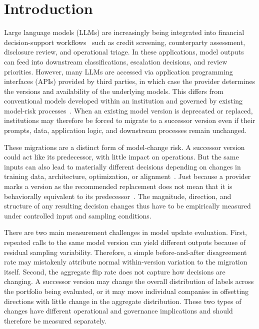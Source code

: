 \documentclass[11pt]{article}
\begin{document}
\section{Introduction}
Large language models (LLMs) are increasingly being integrated into financial decision-support workflows~\cite{bloomberggpt,finbert} such as credit screening, counterparty assessment, disclosure review, and operational triage. In these applications, model outputs can feed into downstream classifications, escalation decisions, and review priorities. However, many LLMs are accessed via application programming interfaces (APIs) provided by third parties, in which case the provider determines the versions and availability of the underlying models. This differs from conventional models developed within an institution and governed by existing model-risk processes~\cite{sr117,sr2602}. When an existing model version is deprecated or replaced, institutions may therefore be forced to migrate to a successor version even if their prompts, data, application logic, and downstream processes remain unchanged.

These migrations are a distinct form of model-change risk. A successor version could act like its predecessor, with little impact on operations. But the same inputs can also lead to materially different decisions depending on changes in training data, architecture, optimization, or alignment~\cite{muscle,underspec,bommasani}. Just because a provider marks a version as the recommended replacement does not mean that it is behaviorally equivalent to its predecessor~\cite{wei}. The magnitude, direction, and structure of any resulting decision changes thus have to be empirically measured under controlled input and sampling conditions.

There are two main measurement challenges in model update evaluation. First, repeated calls to the same model version can yield different outputs because of residual sampling variability. Therefore, a simple before-and-after disagreement rate may mistakenly attribute normal within-version variation to the migration itself. Second, the aggregate flip rate does not capture how decisions are changing. A successor version may change the overall distribution of labels across the portfolio being evaluated, or it may move individual companies in offsetting directions with little change in the aggregate distribution. These two types of changes have different operational and governance implications and should therefore be measured separately.
\end{document}
